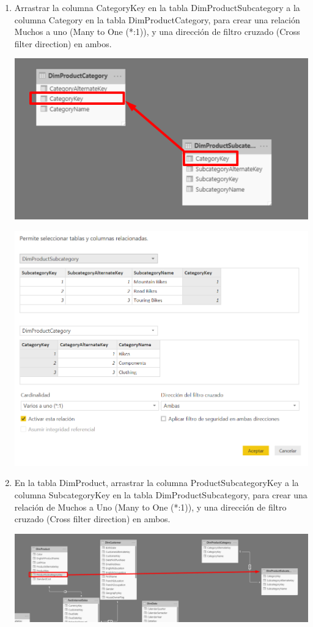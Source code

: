 \begin{itemize}
\begin{enumerate}
\item Arrastrar la columna CategoryKey en la tabla DimProductSubcategory a la columna Category en la tabla DimProductCategory, para crear una relación Muchos a uno (Many to One (*:1)), y una dirección de filtro cruzado (Cross filter direction) en ambos.
\begin{center}
\includegraphics[scale=0.55]{./Imagenes/b7.png}
\end{center}

\begin{center}
\includegraphics[scale=0.55]{./Imagenes/b8.png}
\end{center}

\item En la tabla DimProduct, arrastrar la columna ProductSubcategoryKey a la columna SubcategoryKey en la tabla DimProductSubcategory, para crear una relación de Muchos a Uno (Many to One (*:1)), y una dirección de filtro cruzado (Cross filter direction) en ambos.
\begin{center}
\includegraphics[scale=0.55]{./Imagenes/b9.png}
\end{center}


\end{enumerate}
\end{itemize}
